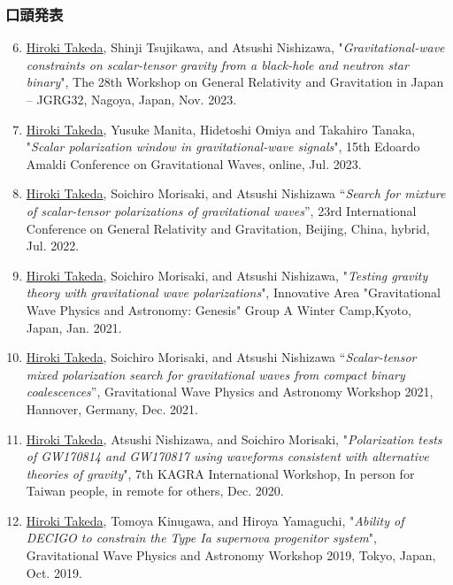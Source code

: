 \documentclass[uplatex, 11pt]{jsarticle}
\begin{document}
\subsubsection*{口頭発表}
\begin{enumerate}
\setcounter{enumi}{5}
\item \uline{Hiroki Takeda}, Shinji Tsujikawa, and Atsushi Nishizawa, "\emph{Gravitational-wave constraints on scalar-tensor gravity from a black-hole and neutron star binary}", The 28th Workshop on General Relativity and Gravitation in Japan – JGRG32, Nagoya, Japan, Nov. 2023.\\

\item \uline{Hiroki Takeda}, Yusuke Manita, Hidetoshi Omiya and Takahiro Tanaka, "\emph{Scalar polarization window in gravitational-wave signals}", 15th Edoardo Amaldi Conference on Gravitational Waves, online, Jul. 2023.\\

\item \uline{Hiroki Takeda}, Soichiro Morisaki, and Atsushi Nishizawa “\emph{Search for mixture of scalar-tensor polarizations of gravitational waves}”, 23rd International Conference on General Relativity and Gravitation, Beijing, China, hybrid, Jul. 2022.\\

\item \uline{Hiroki Takeda}, Soichiro Morisaki, and Atsushi Nishizawa,
"\emph{Testing gravity theory with gravitational wave polarizations}",
Innovative Area "Gravitational Wave Physics and Astronomy: Genesis" Group A Winter Camp,Kyoto, Japan, Jan. 2021.\\

\item \uline{Hiroki Takeda}, Soichiro Morisaki, and Atsushi Nishizawa “\emph{Scalar-tensor mixed polarization search for gravitational waves from compact binary coalescences}”, Gravitational Wave Physics and Astronomy Workshop 2021, Hannover, Germany, Dec. 2021.\\

\item \uline{Hiroki Takeda}, Atsushi Nishizawa, and Soichiro Morisaki, "\emph{Polarization tests of GW170814 and GW170817 using waveforms consistent with alternative theories of gravity}", 7th KAGRA International Workshop, In person for Taiwan people, in remote for others, Dec. 2020.\\

\item \uline{Hiroki Takeda}, Tomoya Kinugawa, and Hiroya Yamaguchi, "\emph{Ability of DECIGO to constrain the Type Ia supernova progenitor system}", Gravitational Wave Physics and Astronomy Workshop 2019, Tokyo, Japan, Oct. 2019.\\


\end{enumerate}
\end{document}
